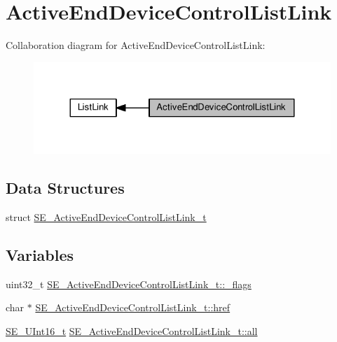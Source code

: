 \hypertarget{group__ActiveEndDeviceControlListLink}{}\section{Active\+End\+Device\+Control\+List\+Link}
\label{group__ActiveEndDeviceControlListLink}
Collaboration diagram for Active\+End\+Device\+Control\+List\+Link\+:\nopagebreak
\begin{figure}[H]
\begin{center}
\leavevmode
\includegraphics[width=324pt]{group__ActiveEndDeviceControlListLink}
\end{center}
\end{figure}
\subsection*{Data Structures}
\begin{DoxyCompactItemize}
\item 
struct \hyperlink{structSE__ActiveEndDeviceControlListLink__t}{S\+E\+\_\+\+Active\+End\+Device\+Control\+List\+Link\+\_\+t}
\end{DoxyCompactItemize}
\subsection*{Variables}
\begin{DoxyCompactItemize}
\item 
uint32\+\_\+t \hyperlink{group__ActiveEndDeviceControlListLink_gad2890eef1f191fbfa7bc7986e8c43b0a}{S\+E\+\_\+\+Active\+End\+Device\+Control\+List\+Link\+\_\+t\+::\+\_\+flags}
\item 
char $\ast$ \hyperlink{group__ActiveEndDeviceControlListLink_ga638f47411afef0238c82266ba67860d5}{S\+E\+\_\+\+Active\+End\+Device\+Control\+List\+Link\+\_\+t\+::href}
\item 
\hyperlink{group__UInt16_gac68d541f189538bfd30cfaa712d20d29}{S\+E\+\_\+\+U\+Int16\+\_\+t} \hyperlink{group__ActiveEndDeviceControlListLink_ga2db41b3930721cb02927b5472619b213}{S\+E\+\_\+\+Active\+End\+Device\+Control\+List\+Link\+\_\+t\+::all}
\end{DoxyCompactItemize}


